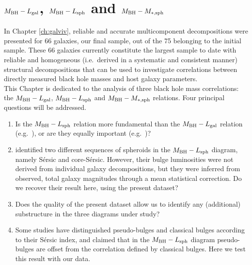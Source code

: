 \chapter{$M_{\rm BH} - L_{\rm gal}$, $M_{\rm BH} - L_{\rm sph}$ and $M_{\rm BH} - M_{\rm *,sph}$ }
\label{ch:mm} 

In Chapter \ref{ch:galviv}, reliable and accurate multicomponent decompositions were presented 
for 66 galaxies, our final sample, out of the 75 belonging to the initial sample. 
These 66 galaxies currently constitute the largest sample to date 
with reliable and homogeneous (i.e.~derived in a systematic and consistent manner) 
structural decompositions 
that can be used to investigate correlations between 
directly measured black hole masses and host galaxy parameters. \\

This Chapter is dedicated to the analysis of three black hole mass correlations: 
the $M_{\rm BH} - L_{\rm gal}$, $M_{\rm BH} - L_{\rm sph}$ and $M_{\rm BH} - M_{\rm *,sph}$ relations. 
Four principal questions will be addressed. 

\begin{enumerate}

\item Is the $M_{\rm BH} - L_{\rm sph}$ relation more fundamental than the $M_{\rm BH} - L_{\rm gal}$ relation 
      (e.g.~\citealt{kormendyho2013}), 
      or are they equally important (e.g.~\citealt{lasker2014anal})?

\item \cite{grahamscott2013} identified two different sequences of spheroids in the $M_{\rm BH} - L_{\rm sph}$ 
      diagram, namely S\'ersic and core-S\'ersic. 
      However, their bulge luminosities were not derived from individual galaxy decompositions, 
      but they were inferred from observed, total galaxy magnitudes 
      through a mean statistical correction. 
      Do we recover their result here, using the present dataset? 
           
\item Does the quality of the present dataset allow us to identify any (additional) substructure 
      in the three diagrams under study?
       
\item Some studies have distinguished pseudo-bulges and classical bulges according to their S\'ersic index, 
      and claimed that in the $M_{\rm BH} - L_{\rm sph}$ diagram 
      pseudo-bulges are offset from the correlation defined by classical bulges. 
      Here we test this result with our data. 

\end{enumerate}

